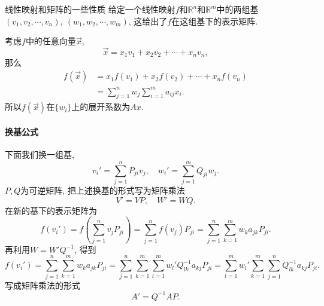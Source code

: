 线性映射和矩阵的一些性质
给定一个线性映射$f$和$\mathbb{R}^{n}$和$\mathbb{R}^{m}$中的两组基$\left( v_1,v_2,\cdots,v_n \right) , \ \left( w_1,w_2,\cdots,w_m \right) $, 这给出了$f$在这组基下的表示矩阵.

考虑$f$中的任意向量$\vec{x}$,
\begin{equation}
  \vec{x} = x_1 v_1 + x_2 v_2 + \cdots + x_n v_n,
\end{equation}
那么
\begin{equation}
    \begin{aligned}
        f\left( \vec{x} \right) & = x_1 f\left( v_1 \right) + x_2 f\left( v_2 \right) + \cdots + x_n f\left( v_n \right)
        \\
        & = \sum_{j=1}^{n} w_j \sum_{i=1}^{m} a_{ij} x_i. 
    \end{aligned}
\end{equation}
所以$f\left( \vec{x} \right) $在$\{ w_{i} \}$上的展开系数为$Ax$.

\paragraph{换基公式}
下面我们换一组基, 
\begin{equation}
  v_i ' = \sum_{j=1}^{n} P_{ji} v_j, \quad w_i ' = \sum_{j=1}^{m} Q_{ji} w_j.
\end{equation}
$P, Q$为可逆矩阵, 把上述换基的形式写为矩阵乘法
\begin{equation}
  V' = V P, \quad W' = W Q.
\end{equation}
在新的基下的表示矩阵为
\begin{equation}
  f\left( v_i' \right) = f\left( \sum_{j=1}^{n} v_j P_{ji} \right) = \sum_{j=1}^{n} f\left( v_j \right) P_{ji} = \sum_{j=1}^{n} \sum_{k=1}^{m} w_k a_{jk} P_{ji}.
\end{equation}
再利用$W = W' Q^{-1}$, 得到
\begin{equation}
  f\left( v_i' \right) = \sum_{j=1}^{n} \sum_{k=1}^{m} w_k a_{jk} P_{ji} = \sum_{j=1}^{n} \sum_{k=1}^{m} \sum_{l=1}^{m} w_l' Q^{-1}_{lk} a_{kj} P_{ji}
  = \sum_{l=1}^{m} w_l' \sum_{k=1}^{m} \sum_{j=1}^{n} Q^{-1}_{lk} a_{kj} P_{ji}.
\end{equation}
写成矩阵乘法的形式
\begin{equation}
  A' = Q^{-1} A P.
\end{equation}


